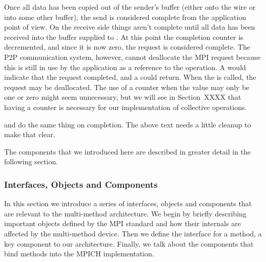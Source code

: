Once all data has been copied out of the sender's buffer (either onto the wire
or into some other buffer), the send is considered complete from the
application point of view.  On the receive side things aren't complete until
all data has been received into the buffer supplied to .
%
At this point the completion counter is decremented, and since it is now zero,
the request is considered complete.  The P2P communication system, however,
cannot deallocate the MPI request because this is still in use by the
application as a reference to the operation.
%
A  would indicate that
the request completed, and a  could return.
%
When the  is called, the request may be deallocated.
%
The use of a counter when the value may only be one or zero might seem
unnecessary, but we will see in Section~XXXX that having a counter is
necessary for our implementation of collective operations.

\begin{cmt}
   and  do the same thing on completion.  The
  above text needs a little cleanup to make that clear.
\end{cmt}

The components that we introduced here are described in greater detail in the
following section.


\subsubsection{Interfaces, Objects and Components}

In this section we introduce a series of interfaces, objects and components
that are relevant to the multi-method architecture.  We begin by briefly
describing important objects defined by the MPI standard and how their
internals are affected by the multi-method device.  Then we define the
interface for a method, a key component to our architecture.  Finally, we talk
about the components that bind methods into the MPICH implementation.

%


